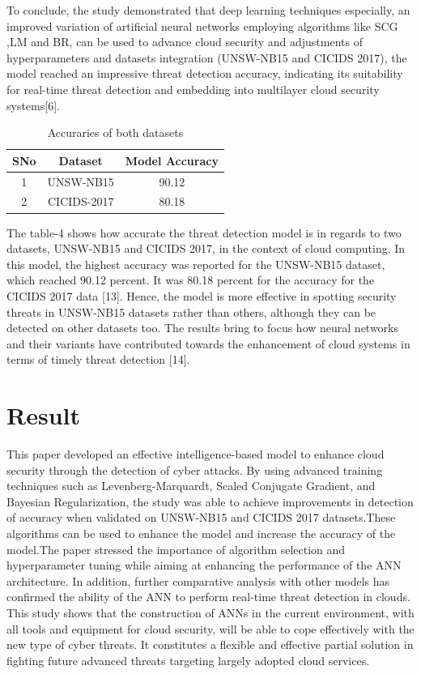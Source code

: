 \documentclass{llncs}
\begin{document}
To conclude, the study demonstrated that deep learning techniques especially, an improved variation of artificial neural networks employing algorithms like SCG ,LM and BR, can be used to advance cloud security  and adjustments of hyperparameters and datasets integration (UNSW-NB15 and CICIDS 2017), the model reached an impressive threat detection accuracy, indicating its suitability for real-time threat detection and embedding into multilayer cloud security systems[6].


\begin{table}[htbp]
\caption{Accuraries of both datasets}
\centering
\begin{tabular}{|c|c|c|}
        \hline
        SNo & Dataset & Model Accuracy \\ \hline
        1 & UNSW-NB15 & 90.12 \\ \hline
        2 & CICIDS-2017 & 80.18 \\ \hline
\end{tabular}
\label{tab 2}
\end{table}
The table-4 shows how accurate the threat detection model is in regards to two datasets, UNSW-NB15 and CICIDS 2017, in the context of cloud computing. In this model, the highest accuracy was reported for the UNSW-NB15 dataset, which reached 90.12 percent. It was 80.18 percent for the accuracy for the CICIDS 2017 data [13]. Hence, the model is more effective in spotting security threats in UNSW-NB15 datasets rather than others, although they can be detected on other datasets too. The results bring to focus how neural networks and their variants have contributed towards the enhancement of cloud systems in terms of timely threat detection [14].

\section{Result}

This paper developed an effective intelligence-based model to enhance cloud security through the detection of cyber attacks. By using advanced training techniques such as Levenberg-Marquardt, Scaled Conjugate Gradient, and Bayesian Regularization, the study was able to achieve improvements in detection of accuracy when validated on UNSW-NB15 and CICIDS 2017 datasets.These algorithms can be used to enhance the model and increase the accuracy of the model.The paper stressed the importance of algorithm selection and hyperparameter tuning while aiming at enhancing the performance of the ANN architecture. In addition, further comparative analysis with other models has confirmed the ability of the ANN to perform real-time threat detection in clouds. This study shows that the construction of ANNs in the current environment, with all tools and equipment for cloud security, will be able to cope effectively with the new type of cyber threats. It constitutes a flexible and effective partial solution in fighting future advanced threats targeting largely adopted cloud services.
\end{document}
